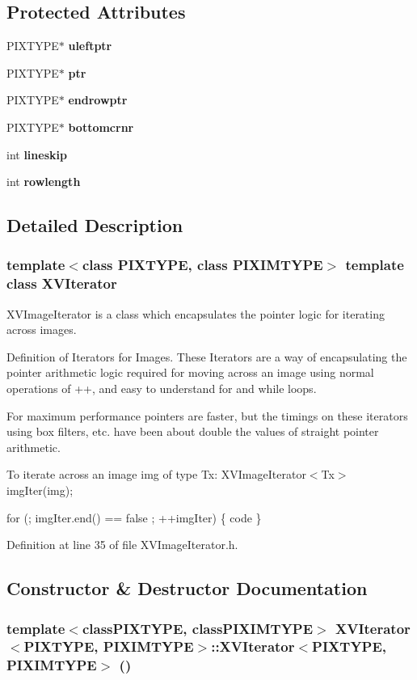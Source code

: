 \subsection*{Protected Attributes}
\begin{CompactItemize}
\item 
PIXTYPE$\ast$ {\bf uleftptr}
\item 
PIXTYPE$\ast$ {\bf ptr}
\item 
PIXTYPE$\ast$ {\bf endrowptr}
\item 
PIXTYPE$\ast$ {\bf bottomcrnr}
\item 
int {\bf lineskip}
\item 
int {\bf rowlength}
\end{CompactItemize}


\subsection{Detailed Description}
\subsubsection*{template$<$class PIXTYPE, class PIXIMTYPE$>$  template class XVIterator}

XVImage\-Iterator is a class which encapsulates the pointer logic for iterating across images.

Definition of Iterators for Images. These Iterators are a way of  encapsulating the pointer arithmetic logic required for moving across an image using normal operations of ++, and easy to understand for and while loops.

For maximum performance pointers are faster, but the timings on  these iterators using box filters, etc. have been about double  the values of straight pointer arithmetic.

To iterate across an image img of type Tx: XVImage\-Iterator$<$Tx$>$ img\-Iter(img);

for (; img\-Iter.end() == false ; ++img\-Iter) \{ code \} 



Definition at line 35 of file XVImage\-Iterator.h.

\subsection{Constructor \& Destructor Documentation}
\label{XVIterator_a0}
\hypertarget{class_XVIterator_a0}{
\subsubsection[XVIterator]{\setlength{\rightskip}{0pt plus 5cm}template$<$classPIXTYPE, classPIXIMTYPE$>$ XVIterator$<$PIXTYPE, PIXIMTYPE$>$::XVIterator$<$PIXTYPE, PIXIMTYPE$>$ ()}}




